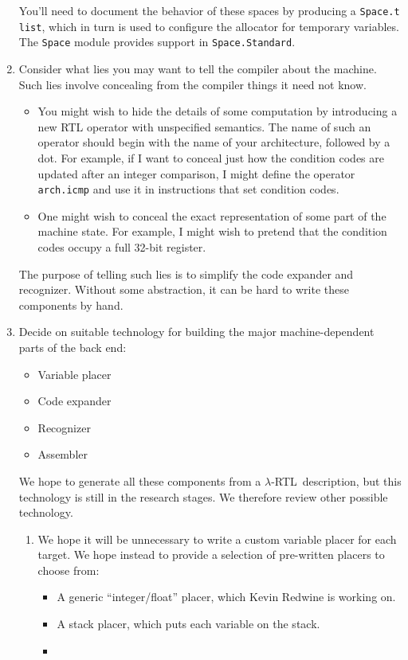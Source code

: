 \documentclass[12pt]{article}
\newcommand\lrtl{\mbox{$\lambda$-RTL}}
\begin{document}
\begin{enumerate}
You'll need to document the behavior of these spaces by producing a
\texttt{Space.t list}, which in turn is used to configure the
allocator for temporary variables.
The \texttt{Space} module provides support in \texttt{Space.Standard}.
\item
Consider what lies you may want to tell the compiler about the
machine.
Such lies involve concealing from the compiler things it need not
know.
\begin{itemize}
\item
You might wish to hide the details of some computation by introducing
a new RTL operator with unspecified semantics.
The name of such an operator should begin with the name of your
architecture, followed by a dot.
For example, if I want to conceal just how the condition codes are
updated after an integer comparison, I might define the operator
\texttt{arch.icmp} and use it in instructions that set condition codes.
\item
One might wish to conceal the exact representation of some part of the
machine state.
For example, I might wish to pretend that the condition codes occupy a
full 32-bit register.
\end{itemize}
The purpose of telling such lies is to simplify the code expander and
recognizer.
Without some abstraction, it can be hard to write these components by
hand.
\item
Decide on suitable technology for building the major machine-dependent
parts of the back end:
\begin{itemize}
\item
Variable placer
\item
Code expander
\item
Recognizer
\item
Assembler
\end{itemize}
We hope to generate all these components from a \lrtl\ description,
but this technology is still in the research stages.
We therefore review other possible technology.
\begin{enumerate}
\item
We hope it will be unnecessary to write a custom variable placer for
each target.
We hope instead to provide a selection of pre-written placers to
choose from:
\begin{itemize}
\item
A generic ``integer/float'' placer, which Kevin Redwine is working on.
\item
A stack placer, which puts each variable on the stack.
\item

\end{itemize}
\end{enumerate}
\end{enumerate}
\end{document}
